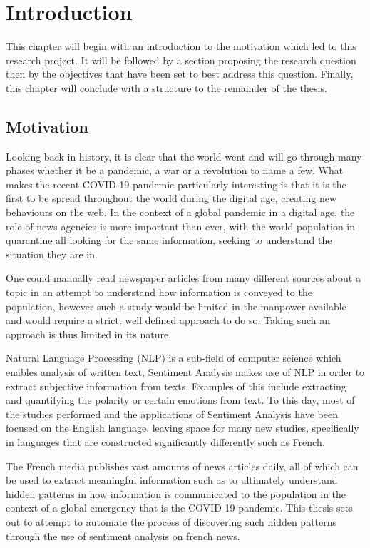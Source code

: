 \chapter{Introduction}\label{Introduction}

This chapter will begin with an introduction to the motivation which led to this research project. It will be followed by a section proposing the research question then by the objectives that have been set to best address this question. Finally, this chapter will conclude with a structure to the remainder of the thesis.

\section{Motivation}\label{Motivation}
Looking back in history, it is clear that the world went and will go through many phases
whether it be a pandemic, a war or a revolution to name a few. What makes the recent COVID-19 pandemic particularly interesting is that it is the first to be spread throughout the world during the digital age, creating new behaviours on the web.   
In the context of a global pandemic in a digital age, the role of news agencies is more important than ever, with the world population in quarantine all looking for the same information, seeking to understand the situation they are in.

One could manually read newspaper articles from many different sources about a topic in an attempt to understand how information is conveyed to the population, however such a study would be limited in the manpower available and would require a strict, well defined approach to do so. Taking such an approach is thus limited in its nature.

Natural Language Processing (NLP) is a sub-field of computer science which enables analysis of written text, Sentiment Analysis makes use of NLP in order to extract subjective information from texts. Examples of this include extracting and quantifying the polarity or certain emotions from text.
To this day, most of the studies performed and the applications of Sentiment Analysis have been focused on the English language, leaving space for many new studies, specifically in languages that are constructed significantly differently such as French.

The French media publishes vast amounts of news articles daily, all of which can be used to extract meaningful information such as to ultimately understand hidden patterns in how information is communicated to the population in the context of a global emergency that is the COVID-19 pandemic.
This thesis sets out to attempt to automate the process of discovering such hidden patterns through the use of sentiment analysis on french news.

